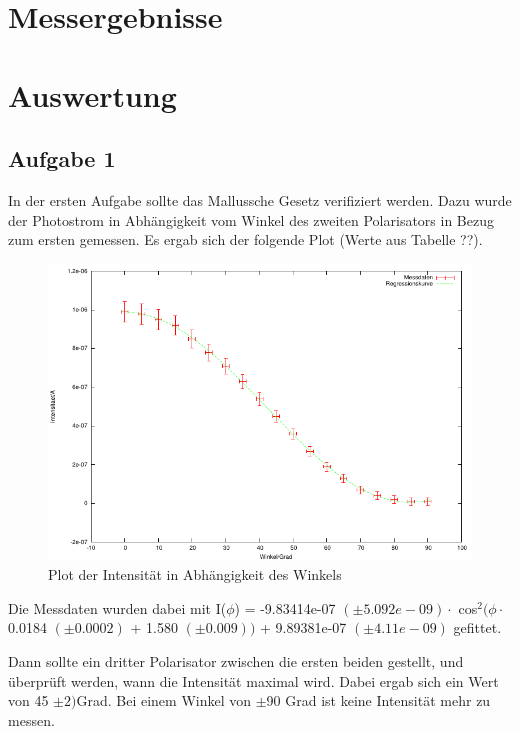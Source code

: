 \documentclass[12pt]{scrartcl}
\begin{document}
\section{Messergebnisse}


\section{Auswertung}

\subsection{Aufgabe 1}
In der ersten Aufgabe sollte das Mallussche Gesetz verifiziert werden. Dazu wurde der Photostrom in Abhängigkeit vom Winkel des zweiten Polarisators in Bezug zum ersten gemessen. Es ergab sich der folgende Plot (Werte aus Tabelle ??).

\begin{figure}[H]
\centering
    \includegraphics[scale = 1]{a_1.pdf}
  	\caption[Plot der Intensität in Abhängigkeit des Winkels]{Plot der Intensität in Abhängigkeit des Winkels}
  \label{fig:a_1}
\end{figure}

Die Messdaten wurden dabei mit I($\phi$) = -9.83414e-07 $(\pm 5.092e-09) \cdot$ cos$^2(\phi \cdot$ 0.0184 $(\pm 0.0002)$ + 1.580 $(\pm 0.009) )$ + 9.89381e-07 $(\pm 4.11e-09)$ gefittet.   

Dann sollte ein dritter Polarisator zwischen die ersten beiden gestellt, und überprüft werden, wann die Intensität maximal wird. Dabei ergab sich ein Wert von 45 $\pm 2)$Grad. Bei einem Winkel von $\pm$90 Grad ist keine Intensität mehr zu messen.
\end{document}
